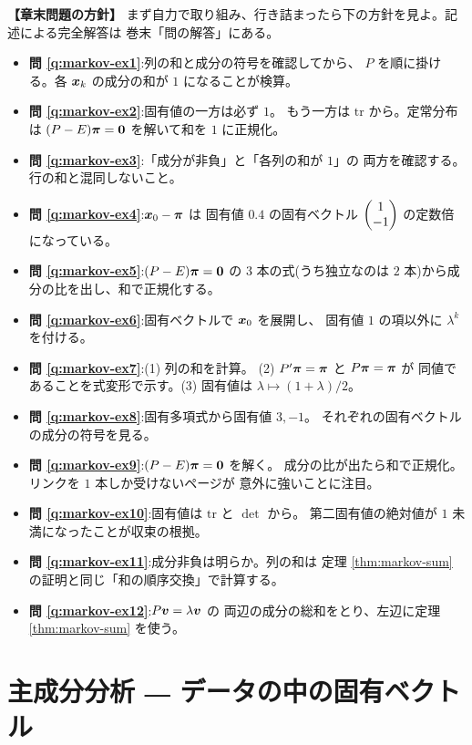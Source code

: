 \bigskip
{\small
\noindent\textbf{【章末問題の方針】}\quad
まず自力で取り組み、行き詰まったら下の方針を見よ。記述による完全解答は
巻末「問の解答」にある。
\begin{itemize}
\item \textbf{問 \ref{q:markov-ex1}}:列の和と成分の符号を確認してから、
$P$ を順に掛ける。各 $\bm{x}_k$ の成分の和が $1$ になることが検算。
\item \textbf{問 \ref{q:markov-ex2}}:固有値の一方は必ず $1$。
もう一方は $\mathrm{tr}$ から。定常分布は $(P - E)\bm{\pi} = \bm{0}$
を解いて和を $1$ に正規化。
\item \textbf{問 \ref{q:markov-ex3}}:「成分が非負」と「各列の和が $1$」の
両方を確認する。行の和と混同しないこと。
\item \textbf{問 \ref{q:markov-ex4}}:$\bm{x}_0 - \bm{\pi}$ は
固有値 $0.4$ の固有ベクトル $\begin{pmatrix}1 \\ -1\end{pmatrix}$ の定数倍になっている。
\item \textbf{問 \ref{q:markov-ex5}}:$(P - E)\bm{\pi} = \bm{0}$ の
$3$ 本の式(うち独立なのは $2$ 本)から成分の比を出し、和で正規化する。
\item \textbf{問 \ref{q:markov-ex6}}:固有ベクトルで $\bm{x}_0$ を展開し、
固有値 $1$ の項以外に $\lambda^k$ を付ける。
\item \textbf{問 \ref{q:markov-ex7}}:(1) 列の和を計算。
(2) $P'\bm{\pi} = \bm{\pi}$ と $P\bm{\pi} = \bm{\pi}$ が
同値であることを式変形で示す。(3) 固有値は $\lambda \mapsto (1+\lambda)/2$。
\item \textbf{問 \ref{q:markov-ex8}}:固有多項式から固有値 $3, -1$。
それぞれの固有ベクトルの成分の符号を見る。
\item \textbf{問 \ref{q:markov-ex9}}:$(P - E)\bm{\pi} = \bm{0}$ を解く。
成分の比が出たら和で正規化。リンクを $1$ 本しか受けないページが
意外に強いことに注目。
\item \textbf{問 \ref{q:markov-ex10}}:固有値は $\mathrm{tr}$ と $\det$ から。
第二固有値の絶対値が $1$ 未満になったことが収束の根拠。
\item \textbf{問 \ref{q:markov-ex11}}:成分非負は明らか。列の和は
定理 \ref{thm:markov-sum} の証明と同じ「和の順序交換」で計算する。
\item \textbf{問 \ref{q:markov-ex12}}:$P\bm{v} = \lambda\bm{v}$ の
両辺の成分の総和をとり、左辺に定理 \ref{thm:markov-sum} を使う。
\end{itemize}
}

\chapter{主成分分析 ― データの中の固有ベクトル}\label{chap:pca}

